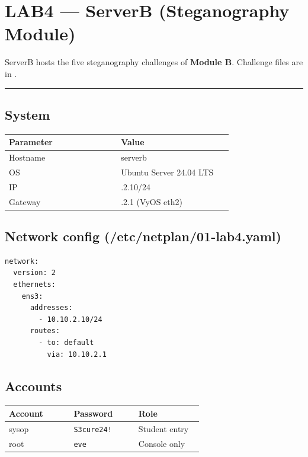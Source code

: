 \section{LAB4 --- ServerB (Steganography Module)}

ServerB hosts the five steganography challenges of \textbf{Module B}. Challenge files are in .

\begin{center}\rule{0.5\linewidth}{0.5pt}\end{center}

\subsection{System}

{\footnotesize\begin{longtable}[]{@{}>{\raggedright\arraybackslash}p{0.45\linewidth}
  >{\raggedright\arraybackslash}p{0.45\linewidth}@{}}
\toprule\noalign{}
Parameter & Value \\
\midrule\noalign{}
\endhead
\bottomrule\noalign{}
\endlastfoot
Hostname & serverb \\
OS & Ubuntu Server 24.04 LTS \\
IP & 10.10.2.10/24 \\
Gateway & 10.10.2.1 (VyOS eth2) \\
\end{longtable}}

\subsection{\texorpdfstring{Network config ({\ttfamily /etc/netplan/01-lab4.yaml})}{Network config (/etc/netplan/01-lab4.yaml)}}

\begin{lstlisting}
network:
  version: 2
  ethernets:
    ens3:
      addresses:
        - 10.10.2.10/24
      routes:
        - to: default
          via: 10.10.2.1
\end{lstlisting}

\subsection{Accounts}

{\footnotesize\begin{longtable}[]{@{}>{\raggedright\arraybackslash}p{0.30\linewidth}
  >{\raggedright\arraybackslash}p{0.30\linewidth}
  >{\raggedright\arraybackslash}p{0.30\linewidth}@{}}
\toprule\noalign{}
Account & Password & Role \\
\midrule\noalign{}
\endhead
\bottomrule\noalign{}
\endlastfoot
sysop & \texttt{S3cure24!} & Student entry \\
root & \texttt{eve} & Console only \\
\end{longtable}}

